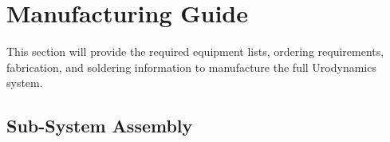 \section{Manufacturing Guide}
This section will provide the required equipment lists, ordering requirements, fabrication, and soldering information to manufacture the full Urodynamics system. 



\clearpage



\clearpage



\subsection{Sub-System Assembly}





\clearpage
